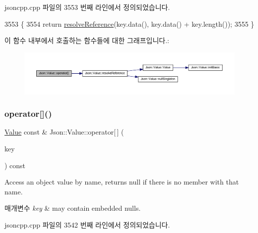 jsoncpp.\+cpp 파일의 3553 번째 라인에서 정의되었습니다.


\begin{DoxyCode}
3553                                                   \{
3554   \textcolor{keywordflow}{return} \hyperlink{class_json_1_1_value_a9ff9cdae2c8f4155bab603d750b0b3f1}{resolveReference}(key.data(), key.data() + key.length());
3555 \}
\end{DoxyCode}
이 함수 내부에서 호출하는 함수들에 대한 그래프입니다.\+:\nopagebreak
\begin{figure}[H]
\begin{center}
\leavevmode
\includegraphics[width=350pt]{class_json_1_1_value_aedd1e152756a4cc8c1ebac0dd7aeeb78_cgraph}
\end{center}
\end{figure}
\mbox{\label{class_json_1_1_value_aba60f69dcd85e935aa85e7a517e03427}} 
\subsubsection{\texorpdfstring{operator[]()}{operator[]()}\hspace{0.1cm}{\footnotesize\ttfamily [8/9]}}
{\footnotesize\ttfamily \hyperlink{class_json_1_1_value}{Value} const  \& Json\+::\+Value\+::operator\mbox{[}$\,$\mbox{]} (\begin{DoxyParamCaption}\item[{const \hyperlink{json_8h_a1e723f95759de062585bc4a8fd3fa4be}{J\+S\+O\+N\+C\+P\+P\+\_\+\+S\+T\+R\+I\+NG} \&}]{key }\end{DoxyParamCaption}) const}

Access an object value by name, returns null if there is no member with that name. 
\begin{DoxyParams}{매개변수}
{\em key} & may contain embedded nulls. \\
\hline
\end{DoxyParams}


jsoncpp.\+cpp 파일의 3542 번째 라인에서 정의되었습니다.


